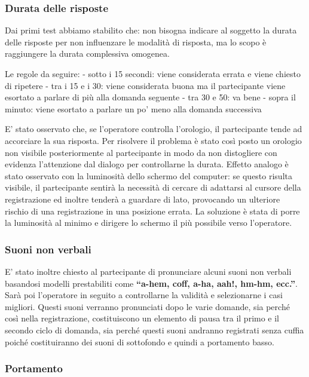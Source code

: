 \documentclass[
]{article}
\begin{document}
\subsubsection{Durata delle risposte}\label{durata-delle-risposte}

Dai primi test abbiamo stabilito che: non bisogna indicare al soggetto la durata delle risposte per non influenzare le modalità di risposta, ma lo scopo è raggiungere la durata complessiva omogenea.

Le regole da seguire: - sotto i 15 secondi: viene considerata errata e viene chiesto di ripetere - tra i 15 e i 30: viene considerata buona ma il partecipante viene esortato a parlare di più alla domanda seguente - tra 30 e 50: va bene - sopra il minuto: viene esortato a parlare un po' meno alla domanda successiva

E' stato osservato che, se l'operatore controlla l'orologio, il partecipante tende ad accorciare la sua risposta. Per risolvere il problema è stato così posto un orologio non visibile posteriormente al partecipante in modo da non distogliere con evidenza l'attenzione dal dialogo per controllarne la durata. Effetto analogo è stato osservato con la luminosità dello schermo del computer: se questo risulta visibile, il partecipante sentirà la necessità di cercare di adattarsi al cursore della registrazione ed inoltre tenderà a guardare di lato, provocando un ulteriore rischio di una registrazione in una posizione errata. La soluzione è stata di porre la luminosità al minimo e dirigere lo schermo il più possibile verso l'operatore.

\subsubsection{Suoni non verbali}\label{suoni-non-verbali}

E' stato inoltre chiesto al partecipante di pronunciare alcuni suoni non verbali basandosi modelli prestabiliti come \textbf{``a-hem, coff, a-ha, aah!, hm-hm, ecc.''}. Sarà poi l'operatore in seguito a controllarne la validità e selezionarne i casi migliori. Questi suoni verranno pronunciati dopo le varie domande, sia perché così nella registrazione, costituiscono un elemento di pausa tra il primo e il secondo ciclo di domanda, sia perché questi suoni andranno registrati senza cuffia poiché costituiranno dei suoni di sottofondo e quindi a portamento basso.

\subsubsection{Portamento}\label{portamento}
\end{document}
